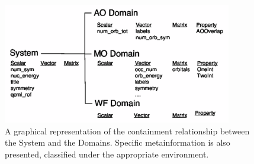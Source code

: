 \begin{center}
\begin{figure}[ht]
\begin{center}
\includegraphics[width=10cm,keepaspectratio]{04_grid/images/q5cost-schema-gimped.eps}
\end{center}
\caption{\footnotesize A graphical representation of the containment
relationship between the System and the Domains. Specific metainformation is also
presented, classified under the appropriate environment.
}
\label{fig:q5cost-schema}
\end{figure}
\end{center}
